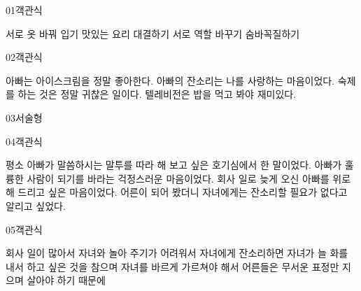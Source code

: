 \documentclass[fs12,seriesSau]{korfarm-base}
\begin{document}
\begin{kfQBlock}{01}{객관식}
\begin{kfChoices}
\kfChoice 서로 옷 바꿔 입기
\kfChoice 맛있는 요리 대결하기
\kfChoice 서로 역할 바꾸기
\kfChoice 숨바꼭질하기
\end{kfChoices}
\end{kfQBlock}
\begin{kfQBlock}{02}{객관식}
\begin{kfChoices}
\kfChoice 아빠는 아이스크림을 정말 좋아한다.
\kfChoice 아빠의 잔소리는 나를 사랑하는 마음이었다.
\kfChoice 숙제를 하는 것은 정말 귀찮은 일이다.
\kfChoice 텔레비전은 밥을 먹고 봐야 재미있다.
\end{kfChoices}
\end{kfQBlock}
\begin{kfQBlock}{03}{서술형}
\end{kfQBlock}
\begin{kfQBlock}{04}{객관식}
\begin{kfChoices}
\kfChoice 평소 아빠가 말씀하시는 말투를 따라 해 보고 싶은 호기심에서 한 말이었다.
\kfChoice 아빠가 훌륭한 사람이 되기를 바라는 걱정스러운 마음이었다.
\kfChoice 회사 일로 늦게 오신 아빠를 위로해 드리고 싶은 마음이었다.
\kfChoice 어른이 되어 봤더니 자녀에게는 잔소리할 필요가 없다고 알리고 싶었다.
\end{kfChoices}
\end{kfQBlock}
\begin{kfQBlock}{05}{객관식}
\begin{kfChoices}
\kfChoice 회사 일이 많아서 자녀와 놀아 주기가 어려워서
\kfChoice 자녀에게 잔소리하면 자녀가 늘 화를 내서
\kfChoice 하고 싶은 것을 참으며 자녀를 바르게 가르쳐야 해서
\kfChoice 어른들은 무서운 표정만 지으며 살아야 하기 때문에
\end{kfChoices}
\end{kfQBlock}


\end{document}
